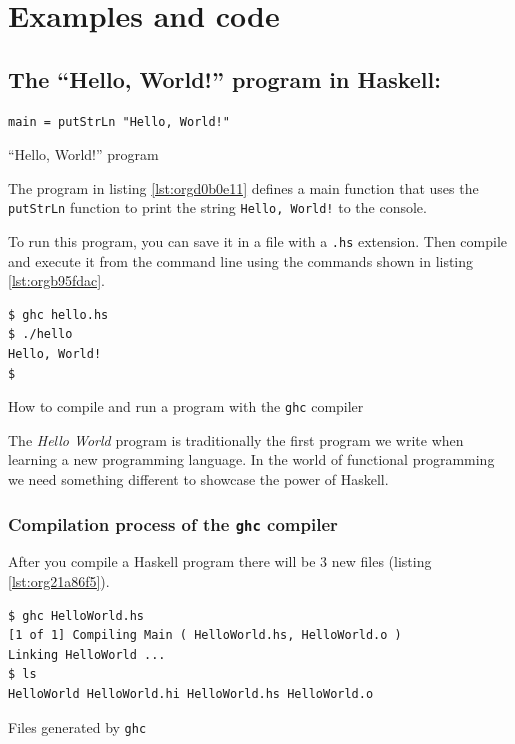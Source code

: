 \documentclass[a4paper, titlepage, twoside]{article}
\begin{document}
\section{Examples and code}
\label{sec:org76bf952}

\subsection{The ``Hello, World!'' program in Haskell:}
\label{sec:org1bc090e}

\begin{listing}[htbp]
\begin{verbatim}
main = putStrLn "Hello, World!"
\end{verbatim}
\caption{\label{lst:orgd0b0e11}``Hello, World!'' program}
\end{listing}

The program in listing \ref{lst:orgd0b0e11} defines a main function that uses the \texttt{putStrLn} function to print the string \texttt{Hello, World!} to the console.

To run this program, you can save it in a file with a \texttt{.hs} extension. Then compile and execute it from the command line using the commands shown in listing \ref{lst:orgb95fdac}.

\begin{listing}[htbp]
\begin{verbatim}
$ ghc hello.hs
$ ./hello
Hello, World!
$
\end{verbatim}
\caption{\label{lst:orgb95fdac}How to compile and run a program with the \texttt{ghc} compiler}
\end{listing}

The \emph{Hello World} program is traditionally the first program we write when learning a new programming language. In the world of functional programming we need something different to showcase the power of Haskell.

\subsubsection{Compilation process of the \texttt{ghc} compiler}
\label{sec:orgea52f87}

After you compile a Haskell program there will be 3 new files (listing \ref{lst:org21a86f5}).

\begin{listing}[htbp]
\begin{verbatim}
$ ghc HelloWorld.hs
[1 of 1] Compiling Main ( HelloWorld.hs, HelloWorld.o )
Linking HelloWorld ...
$ ls
HelloWorld HelloWorld.hi HelloWorld.hs HelloWorld.o
\end{verbatim}
\caption{\label{lst:org21a86f5}Files generated by \texttt{ghc}}
\end{listing}
\end{document}
